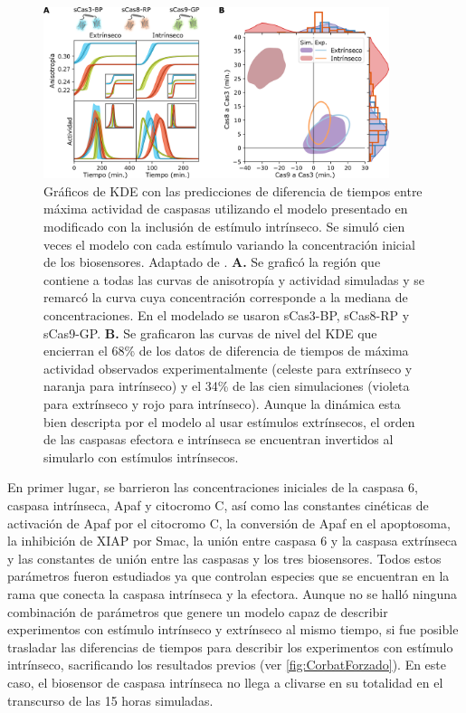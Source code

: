 \begin{figure}[b!]
    \centering
    \includegraphics[width=0.9\textwidth]{img/cap_4/exp_vs_Corbat.png}
    \caption{\footnotesize{Gráficos de KDE con las predicciones de diferencia de tiempos entre máxima actividad de caspasas utilizando el modelo presentado en \cite{Corbat2018} modificado con la inclusión de estímulo intrínseco. Se simuló cien veces el modelo con cada estímulo variando la concentración inicial de los biosensores.  Adaptado de \cite{Corbat2021}. \textbf{A.} Se graficó la región que contiene a todas las curvas de anisotropía y actividad simuladas y se remarcó la curva cuya concentración corresponde a la mediana de concentraciones. En el modelado se usaron sCas3-BP, sCas8-RP y sCas9-GP. \textbf{B.} Se graficaron las curvas de nivel del KDE que encierran el 68\% de los datos de diferencia de tiempos de máxima actividad observados experimentalmente (celeste para extrínseco y naranja  para intrínseco) y el 34\% de las cien simulaciones (violeta para extrínseco y rojo  para intrínseco). Aunque la dinámica esta bien descripta por el modelo al usar estímulos extrínsecos, el orden de las caspasas efectora e intrínseca se encuentran invertidos al simularlo con estímulos intrínsecos.}}
    \label{fig:exp_vs_Corbat}
\end{figure}

En primer lugar, se barrieron las concentraciones iniciales de la caspasa 6, caspasa intrínseca, Apaf y citocromo C, así como las constantes cinéticas de activación de Apaf por el citocromo C, la conversión de Apaf en el apoptosoma, la inhibición de XIAP por Smac, la unión entre caspasa 6 y la caspasa extrínseca y las constantes de unión entre las caspasas y los tres biosensores. Todos estos parámetros fueron estudiados ya que controlan especies que se encuentran en la rama que conecta la caspasa intrínseca y la efectora. Aunque no se halló ninguna combinación de parámetros que genere un modelo capaz de describir experimentos con estímulo intrínseco y extrínseco al mismo tiempo, si fue posible trasladar las diferencias de tiempos para describir los experimentos con estímulo intrínseco, sacrificando los resultados previos (ver \cref{fig:CorbatForzado}). En este caso, el biosensor de caspasa intrínseca no llega a clivarse en su totalidad en el transcurso de las 15 horas simuladas.


